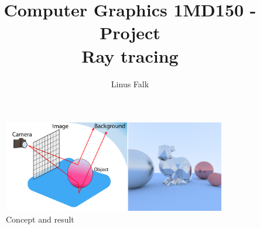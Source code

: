 \documentclass[a4paper]{article}
\title{\vspace{-2.0cm}Computer Graphics 1MD150 - Project\\ Ray tracing}
\date{}
\author{\vspace{-5cm}Linus Falk}
\begin{document}
\maketitle
{}

\vspace{-9mm}
\begin{figure}[ht!]
\centering
\includegraphics[height=40mm]{figures/cg_project.pdf}
\caption{Concept and result}
\label{fig:example}
\end{figure}
\end{document}
